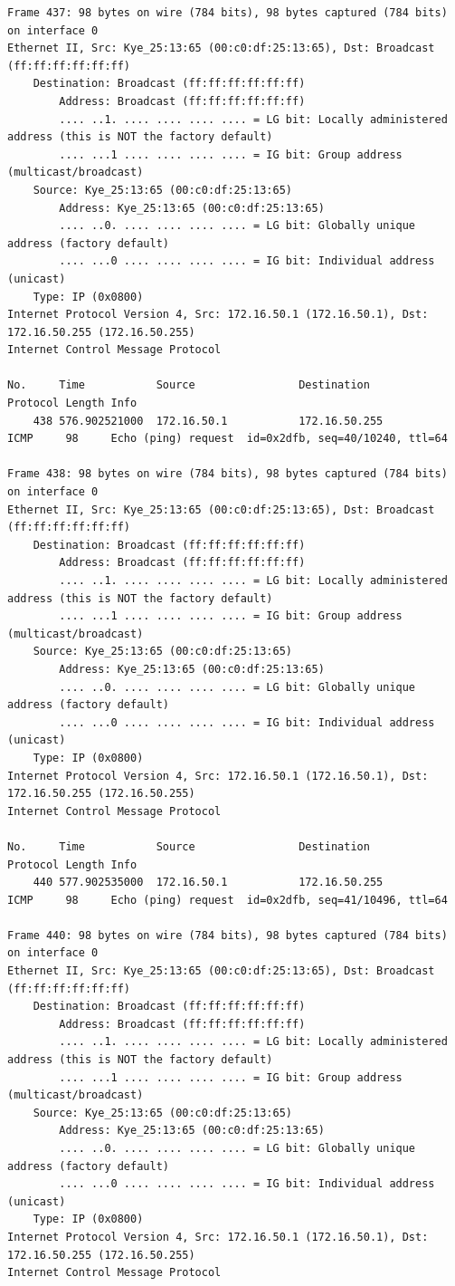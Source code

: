 \documentclass[a4paper,11pt]{article}
\begin{document}
\begin{lstlisting}
Frame 437: 98 bytes on wire (784 bits), 98 bytes captured (784 bits) on interface 0
Ethernet II, Src: Kye_25:13:65 (00:c0:df:25:13:65), Dst: Broadcast (ff:ff:ff:ff:ff:ff)
    Destination: Broadcast (ff:ff:ff:ff:ff:ff)
        Address: Broadcast (ff:ff:ff:ff:ff:ff)
        .... ..1. .... .... .... .... = LG bit: Locally administered address (this is NOT the factory default)
        .... ...1 .... .... .... .... = IG bit: Group address (multicast/broadcast)
    Source: Kye_25:13:65 (00:c0:df:25:13:65)
        Address: Kye_25:13:65 (00:c0:df:25:13:65)
        .... ..0. .... .... .... .... = LG bit: Globally unique address (factory default)
        .... ...0 .... .... .... .... = IG bit: Individual address (unicast)
    Type: IP (0x0800)
Internet Protocol Version 4, Src: 172.16.50.1 (172.16.50.1), Dst: 172.16.50.255 (172.16.50.255)
Internet Control Message Protocol

No.     Time           Source                Destination           Protocol Length Info
    438 576.902521000  172.16.50.1           172.16.50.255         ICMP     98     Echo (ping) request  id=0x2dfb, seq=40/10240, ttl=64

Frame 438: 98 bytes on wire (784 bits), 98 bytes captured (784 bits) on interface 0
Ethernet II, Src: Kye_25:13:65 (00:c0:df:25:13:65), Dst: Broadcast (ff:ff:ff:ff:ff:ff)
    Destination: Broadcast (ff:ff:ff:ff:ff:ff)
        Address: Broadcast (ff:ff:ff:ff:ff:ff)
        .... ..1. .... .... .... .... = LG bit: Locally administered address (this is NOT the factory default)
        .... ...1 .... .... .... .... = IG bit: Group address (multicast/broadcast)
    Source: Kye_25:13:65 (00:c0:df:25:13:65)
        Address: Kye_25:13:65 (00:c0:df:25:13:65)
        .... ..0. .... .... .... .... = LG bit: Globally unique address (factory default)
        .... ...0 .... .... .... .... = IG bit: Individual address (unicast)
    Type: IP (0x0800)
Internet Protocol Version 4, Src: 172.16.50.1 (172.16.50.1), Dst: 172.16.50.255 (172.16.50.255)
Internet Control Message Protocol

No.     Time           Source                Destination           Protocol Length Info
    440 577.902535000  172.16.50.1           172.16.50.255         ICMP     98     Echo (ping) request  id=0x2dfb, seq=41/10496, ttl=64

Frame 440: 98 bytes on wire (784 bits), 98 bytes captured (784 bits) on interface 0
Ethernet II, Src: Kye_25:13:65 (00:c0:df:25:13:65), Dst: Broadcast (ff:ff:ff:ff:ff:ff)
    Destination: Broadcast (ff:ff:ff:ff:ff:ff)
        Address: Broadcast (ff:ff:ff:ff:ff:ff)
        .... ..1. .... .... .... .... = LG bit: Locally administered address (this is NOT the factory default)
        .... ...1 .... .... .... .... = IG bit: Group address (multicast/broadcast)
    Source: Kye_25:13:65 (00:c0:df:25:13:65)
        Address: Kye_25:13:65 (00:c0:df:25:13:65)
        .... ..0. .... .... .... .... = LG bit: Globally unique address (factory default)
        .... ...0 .... .... .... .... = IG bit: Individual address (unicast)
    Type: IP (0x0800)
Internet Protocol Version 4, Src: 172.16.50.1 (172.16.50.1), Dst: 172.16.50.255 (172.16.50.255)
Internet Control Message Protocol


\end{lstlisting}
\end{document}
